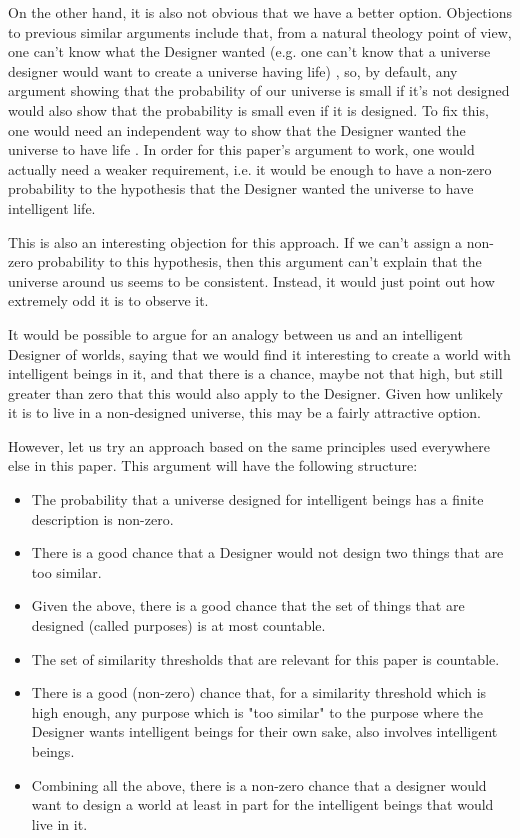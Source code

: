 \documentclass[a4paper
,draft
]{article}
\newcommand{\paper}[1]{paper}
\begin{document}
On the other hand, it is also not obvious that we have a better option.
Objections to previous similar arguments include that,
from a natural theology point of view, one can't
know what the Designer wanted
(e.g. one can't know that a universe designer would want to create
a universe having life) \parencites{Sober2009}{Narveson2003}, so, by default,
any argument showing that the probability of our universe is small
if it's not designed would also show that the probability is small
even if it is designed.
To fix this, one would need an independent way to show that the Designer
wanted the universe to have life \parencite{Sober2003}.
In order for this paper's argument to work, one would actually need a weaker
requirement, i.e. it would be enough to have a non-zero probability
to the hypothesis that the Designer wanted the universe to have intelligent
life.

This is also an interesting objection for this approach.
If we can't assign a
non-zero probability to this hypothesis, then this argument can't explain
that the universe around us seems to be consistent.
Instead, it would just point out how extremely odd it is to observe it.

It would be possible to argue for an analogy between us and
an intelligent Designer of worlds, saying that we would find it interesting
to create a world with intelligent beings in it, and that there is a chance,
maybe not that high, but still greater than zero that this would also apply
to the Designer.
Given how unlikely it is to live in a non-designed universe, this may be
a fairly attractive option.

However, let us try an approach based on the same principles used everywhere
else in this \paper{}.
This argument will have the following structure:
\begin{itemize}
  \item The probability that a universe designed for intelligent beings
        has a finite description is non-zero.
  \item There is a good chance that a Designer would not design two things
        that are too similar.
  \item Given the above, there is a good chance that the set of things that
        are designed (called purposes) is at most countable.
  \item The set of similarity thresholds that are relevant for this paper is
        countable.
  \item There is a good (non-zero) chance that, for a similarity threshold
        which is high enough,
        any purpose which is "too similar" to the purpose where the Designer
        wants intelligent beings for their own sake, also involves intelligent
        beings.
  \item Combining all the above, there is a non-zero chance that a designer
        would want to design a world at least in part for the intelligent
        beings that would live in it.
\end{itemize}
\end{document}

